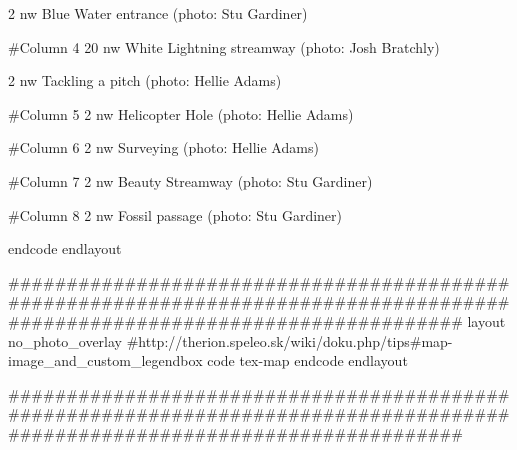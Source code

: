 {       {2} {nw} {
	\legendwidth=30cm\hsize=30cm\size[30]\vskip0.2cm
        Blue Water entrance (photo: Stu Gardiner)
        } 

#Column 4
       {20} {nw} {
	\legendwidth=30cm\hsize=30cm\size[30]\vskip0.2cm
	White Lightning streamway (photo: Josh Bratchly)
        } 

       {2} {nw} {
	\legendwidth=30cm\hsize=30cm\size[30]\vskip0.2cm
        Tackling a pitch (photo: Hellie Adams)
        } 

#Column 5
       {2} {nw} {
	\legendwidth=30cm\hsize=30cm\size[30]\vskip0.2cm
        Helicopter Hole (photo: Hellie Adams)
	} 


#Column 6
       {2} {nw} {
	\legendwidth=30cm\hsize=30cm\size[30]\vskip0.2cm
        Surveying (photo: Hellie Adams)
	} 


#Column 7
       {2} {nw} {
	\legendwidth=30cm\hsize=30cm\size[30]\vskip0.2cm
        Beauty Streamway (photo: Stu Gardiner)
	} 


#Column 8
       {2} {nw} {
	\legendwidth=30cm\hsize=30cm\size[30]\vskip0.2cm
        Fossil passage (photo: Stu Gardiner)
	} 
           


    }	
  endcode
endlayout

#############################################################################################################################
layout no_photo_overlay
  #http://therion.speleo.sk/wiki/doku.php/tips#map-image_and_custom_legendbox
  code tex-map
    \def\maplayout{
      \legendbox{75}{95}{NW}{
        \legendwidth 70 cm
        \the\legendcontent
        }
      \legendbox{1}{55}{NW}{
        \legendwidth 150 cm
        \legendtextsize={\size[30]}
        \hsize=\legendwidth
        
      }
    }	
  endcode
endlayout

#############################################################################################################################

